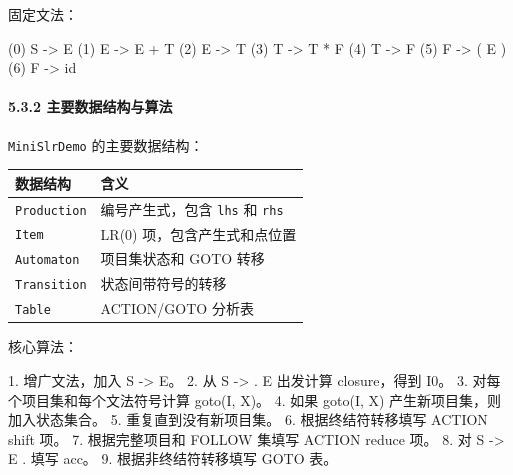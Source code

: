 \documentclass[
  a4paper,
  fontset=none,
]{ctexart}
\newenvironment{Shaded}{}{}
\newcommand{\NormalTok}[1]{#1}
\begin{document}
固定文法：

\begin{Shaded}
\begin{Highlighting}[]
\NormalTok{(0) S\textquotesingle{} {-}\textgreater{} E}
\NormalTok{(1) E {-}\textgreater{} E + T}
\NormalTok{(2) E {-}\textgreater{} T}
\NormalTok{(3) T {-}\textgreater{} T * F}
\NormalTok{(4) T {-}\textgreater{} F}
\NormalTok{(5) F {-}\textgreater{} ( E )}
\NormalTok{(6) F {-}\textgreater{} id}
\end{Highlighting}
\end{Shaded}

\hypertarget{ux4e3bux8981ux6570ux636eux7ed3ux6784ux4e0eux7b97ux6cd5}{%
\paragraph{5.3.2
主要数据结构与算法}\label{ux4e3bux8981ux6570ux636eux7ed3ux6784ux4e0eux7b97ux6cd5}}

\texttt{MiniSlrDemo} 的主要数据结构：

\begin{longtable}[]{@{}ll@{}}
\toprule\noalign{}
数据结构 & 含义 \\
\midrule\noalign{}
\endhead
\bottomrule\noalign{}
\endlastfoot
\texttt{Production} & 编号产生式，包含 \texttt{lhs} 和 \texttt{rhs} \\
\texttt{Item} & LR(0) 项，包含产生式和点位置 \\
\texttt{Automaton} & 项目集状态和 GOTO 转移 \\
\texttt{Transition} & 状态间带符号的转移 \\
\texttt{Table} & ACTION/GOTO 分析表 \\
\end{longtable}

核心算法：

\begin{Shaded}
\begin{Highlighting}[]
\NormalTok{1. 增广文法，加入 S\textquotesingle{} {-}\textgreater{} E。}
\NormalTok{2. 从 S\textquotesingle{} {-}\textgreater{} . E 出发计算 closure，得到 I0。}
\NormalTok{3. 对每个项目集和每个文法符号计算 goto(I, X)。}
\NormalTok{4. 如果 goto(I, X) 产生新项目集，则加入状态集合。}
\NormalTok{5. 重复直到没有新项目集。}
\NormalTok{6. 根据终结符转移填写 ACTION shift 项。}
\NormalTok{7. 根据完整项目和 FOLLOW 集填写 ACTION reduce 项。}
\NormalTok{8. 对 S\textquotesingle{} {-}\textgreater{} E . 填写 acc。}
\NormalTok{9. 根据非终结符转移填写 GOTO 表。}
\end{Highlighting}
\end{Shaded}
\end{document}
